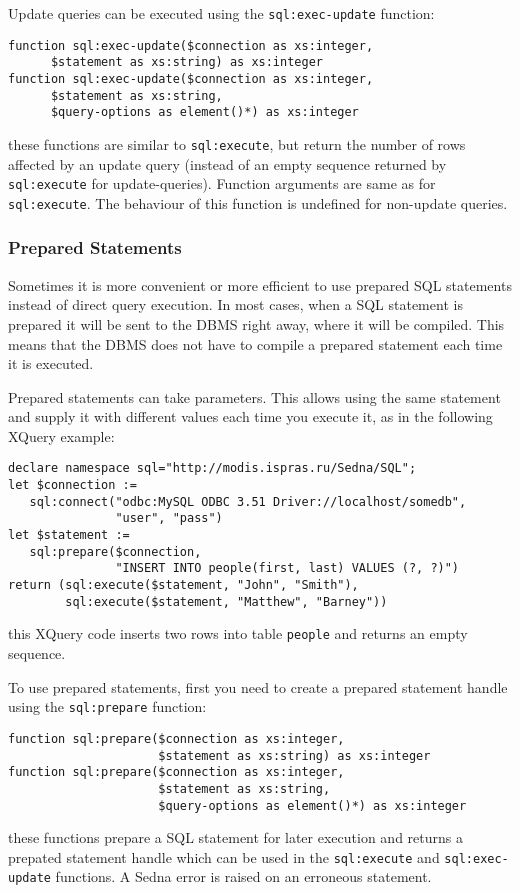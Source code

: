 \documentclass[a4paper,12pt]{article}
\begin{document}
Update queries can be executed using the \verb!sql:exec-update! function:
\begin{verbatim}
function sql:exec-update($connection as xs:integer,
      $statement as xs:string) as xs:integer
function sql:exec-update($connection as xs:integer,
      $statement as xs:string,
      $query-options as element()*) as xs:integer
\end{verbatim}
these functions are similar to \verb!sql:execute!, but return the number of rows
affected by an update query (instead of an empty sequence returned by
\verb!sql:execute! for update-queries). Function arguments are same as for
\verb!sql:execute!. The behaviour of this function is undefined for non-update
queries.


\subsubsection*{Prepared Statements}
Sometimes it is more convenient or more efficient to use prepared SQL statements
instead of direct query execution. In most cases, when a SQL statement is
prepared it will be sent to the DBMS right away, where it will be compiled. This
means that the DBMS does not have to compile a prepared statement each time it
is executed.

Prepared statements can take parameters. This allows using the same statement
and supply it with different values each time you execute it, as in the
following XQuery example:
\small{
\begin{verbatim}
declare namespace sql="http://modis.ispras.ru/Sedna/SQL";
let $connection :=
   sql:connect("odbc:MySQL ODBC 3.51 Driver://localhost/somedb",
               "user", "pass")
let $statement :=
   sql:prepare($connection, 
               "INSERT INTO people(first, last) VALUES (?, ?)")
return (sql:execute($statement, "John", "Smith"),
        sql:execute($statement, "Matthew", "Barney"))
\end{verbatim}}
\noindent
this XQuery code inserts two rows into table \verb!people! and returns an empty
sequence.

To use prepared statements, first you need to create a prepared statement handle
using the \verb!sql:prepare! function:
\small{
\begin{verbatim}
function sql:prepare($connection as xs:integer,
                     $statement as xs:string) as xs:integer
function sql:prepare($connection as xs:integer,
                     $statement as xs:string,
                     $query-options as element()*) as xs:integer
\end{verbatim}}
\noindent
these functions prepare a SQL statement for later execution and returns a
prepated statement handle which can be used in the \verb!sql:execute! and
\verb!sql:exec-update! functions. A Sedna error is raised on an erroneous
statement.
\end{document}
